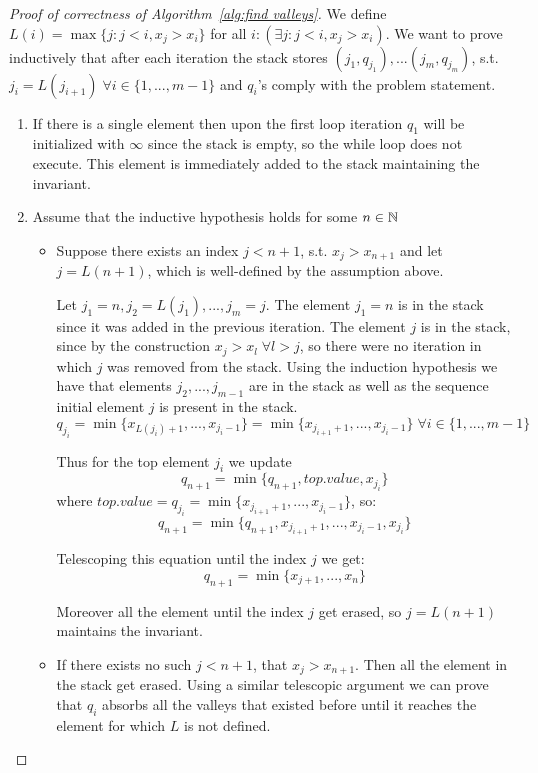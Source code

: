 \begin{proof}[Proof of correctness of Algorithm~\ref{alg:find valleys}] \hfill

    We define $L(i) = \max \{j: j < i, x_j > x_i\}$ for all $i: (\exists j: j < i,  x_j > x_i)$. We want to prove inductively that after each iteration the stack stores $(j_1, q_{j_1}), ... (j_m, q_{j_m})$, s.t. $j_i = L(j_{i + 1}) \; \forall i \in \{1, ..., m-1\}$ and $q_i$'s comply with the problem statement. 
    \begin{enumerate}[align = left]
        \item[$n = 1$:] If there is a single element then upon the first loop iteration $q_1$ will be initialized with $\infty$ since the stack is empty, so the while loop does not execute. This element is immediately added to the stack maintaining the invariant.
        \item[$n \to n + 1$:] Assume that the inductive hypothesis holds for some $n \in \mathbb{N}$
        \begin{itemize}
            \item Suppose there exists an index $j < n+1$, s.t. $x_j > x_{n+1}$ and let $j = L(n+1)$, which is well-defined by the assumption above.
            
            Let $j_1 = n, j_2 = L(j_1), ..., j_m = j$. The element $j_1 = n$ is in the stack since it was added in the previous iteration. The element $j$ is in the stack, since by the construction $x_j > x_l \; \forall l > j$, so there were no iteration in which $j$ was removed from the stack. Using the induction hypothesis we have that elements $j_2, ..., j_{m - 1}$ are in the stack as well as the sequence initial element $j$ is present in the stack. 
            \[q_{j_i} = \min \{x_{L(j_i) + 1}, ..., x_{j_{i} - 1}\} = \min \{x_{j_{i + 1} + 1}, ..., x_{j_{i} - 1}\} \; \forall i \in \{1, ..., m-1\}\]
            
            Thus for the top element $j_i$ we update
            \[q_{n+1} = \min\{q_{n+1}, top.value, x_{j_i}\}\]
            where $top.value = q_{j_i} = \min \{x_{j_{i + 1} + 1}, ..., x_{j_{i} - 1}\}$, so:
            \[q_{n+1} = \min\{q_{n+1}, x_{j_{i + 1} + 1}, ..., x_{j_{i} - 1}, x_{j_{i}}\}\]

            Telescoping this equation until the index $j$ we get:
            \[q_{n+1} = \min\{x_{j + 1}, ..., x_{n}\}\] 

            Moreover all the element until the index $j$ get erased, so $j = L(n+1)$ maintains the invariant.
            \item If there exists no such $j < n+1$, that $x_j > x_{n+1}$. Then all the element in the stack get erased. Using a similar telescopic argument we can prove that $q_i$ absorbs all the valleys that existed before until it reaches the element for which $L$ is not defined.
        \end{itemize}
    \end{enumerate}
\end{proof}